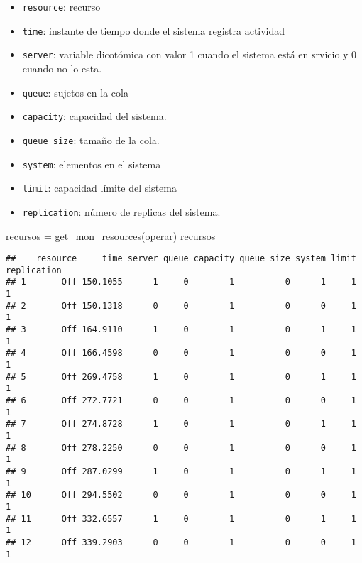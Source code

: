 \documentclass[
]{book}
\newenvironment{Shaded}{\begin{snugshade}}{\end{snugshade}}
\newcommand{\FunctionTok}[1]{\textcolor[rgb]{0.00,0.00,0.00}{#1}}
\newcommand{\NormalTok}[1]{#1}
\newcommand{\OtherTok}[1]{\textcolor[rgb]{0.56,0.35,0.01}{#1}}
\providecommand{\tightlist}{%
  \setlength{\itemsep}{0pt}\setlength{\parskip}{0pt}}
\theoremstyle{definition}
\theoremstyle{definition}
\theoremstyle{definition}
\theoremstyle{definition}
\theoremstyle{remark}
\begin{document}
\begin{itemize}
\tightlist
\item
  \texttt{resource}: recurso
\item
  \texttt{time}: instante de tiempo donde el sistema registra actividad
\item
  \texttt{server}: variable dicotómica con valor 1 cuando el sistema está en srvicio y 0 cuando no lo esta.
\item
  \texttt{queue}: sujetos en la cola
\item
  \texttt{capacity}: capacidad del sistema.
\item
  \texttt{queue\_size}: tamaño de la cola.
\item
  \texttt{system}: elementos en el sistema
\item
  \texttt{limit}: capacidad límite del sistema
\item
  \texttt{replication}: número de replicas del sistema.
\end{itemize}

\begin{Shaded}
\begin{Highlighting}[]
\NormalTok{recursos }\OtherTok{=} \FunctionTok{get\_mon\_resources}\NormalTok{(operar)}
\NormalTok{recursos}
\end{Highlighting}
\end{Shaded}

\begin{verbatim}
##    resource     time server queue capacity queue_size system limit replication
## 1       Off 150.1055      1     0        1          0      1     1           1
## 2       Off 150.1318      0     0        1          0      0     1           1
## 3       Off 164.9110      1     0        1          0      1     1           1
## 4       Off 166.4598      0     0        1          0      0     1           1
## 5       Off 269.4758      1     0        1          0      1     1           1
## 6       Off 272.7721      0     0        1          0      0     1           1
## 7       Off 274.8728      1     0        1          0      1     1           1
## 8       Off 278.2250      0     0        1          0      0     1           1
## 9       Off 287.0299      1     0        1          0      1     1           1
## 10      Off 294.5502      0     0        1          0      0     1           1
## 11      Off 332.6557      1     0        1          0      1     1           1
## 12      Off 339.2903      0     0        1          0      0     1           1
\end{verbatim}
\end{document}
